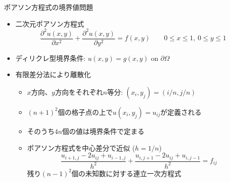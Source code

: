 \begin{frame}[t,fragile]{ポアソン方程式の境界値問題}
  \begin{itemize}
  \item 二次元ポアソン方程式
    \[ \frac{\partial^2 u(x,y)}{\partial x^2} + \frac{\partial^2 u(x,y)}{\partial y^2} = f(x,y) \qquad 0 \le x \le 1, \ 0 \le y \le 1\]
  \item ディリクレ型境界条件: $u(x,y) = g(x,y)$ on $\partial \Omega$
  \item 有限差分法により離散化
    \begin{itemize}
    \item $x$方向、$y$方向をそれぞれ$n$等分: $(x_i,y_j) = (i/n, j/n)$
    \item $(n+1)^2$個の格子点の上で$u(x_i,y_j)=u_{ij}$が定義される
    \item そのうち$4n$個の値は境界条件で定まる
    \item ポアソン方程式を中心差分で近似 ($h=1/n$)
      \[
      \frac{u_{i+1,j}-2u_{ij}+u_{i-1,j}}{h^2} + \frac{u_{i,j+1}-2u_{ij}+u_{i,j-1}}{h^2} = f_{ij}
      \]
      残り$(n-1)^2$個の未知数に対する連立一次方程式
    \end{itemize}
  \end{itemize}
\end{frame}
